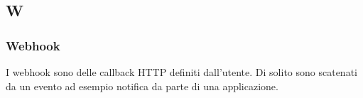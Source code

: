 \subsection*{\textbf{\hfill \Huge{W} \hfill}} 
\subsubsection*{Webhook}
I webhook sono delle callback HTTP definiti dall'utente. Di solito sono scatenati da un evento ad esempio notifica da parte di una applicazione.

